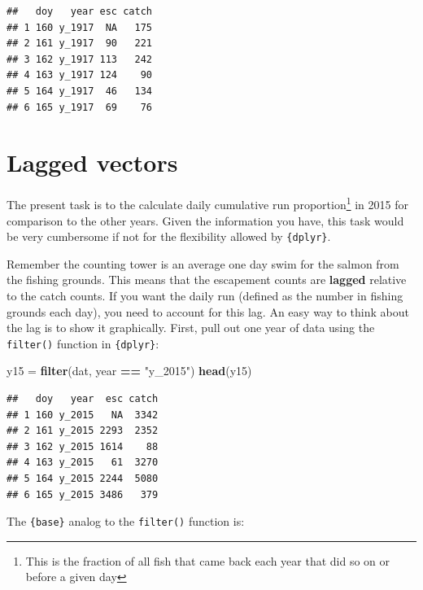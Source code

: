 \documentclass[]{book}
\newenvironment{Shaded}{\begin{snugshade}}{\end{snugshade}}
\newcommand{\KeywordTok}[1]{\textcolor[rgb]{0.13,0.29,0.53}{\textbf{#1}}}
\newcommand{\StringTok}[1]{\textcolor[rgb]{0.31,0.60,0.02}{#1}}
\newcommand{\CommentTok}[1]{\textcolor[rgb]{0.56,0.35,0.01}{\textit{#1}}}
\newcommand{\OperatorTok}[1]{\textcolor[rgb]{0.81,0.36,0.00}{\textbf{#1}}}
\newcommand{\NormalTok}[1]{#1}
\let\rmarkdownfootnote\footnote%
\def\footnote{\protect\rmarkdownfootnote}
\theoremstyle{definition}
\theoremstyle{definition}
\theoremstyle{definition}
\theoremstyle{remark}
\begin{document}
\begin{verbatim}
##   doy   year esc catch
## 1 160 y_1917  NA   175
## 2 161 y_1917  90   221
## 3 162 y_1917 113   242
## 4 163 y_1917 124    90
## 5 164 y_1917  46   134
## 6 165 y_1917  69    76
\end{verbatim}

\section{Lagged vectors}\label{lagged-vectors}

The present task is to the calculate daily cumulative run
proportion\footnote{This is the fraction of all fish that came back each
  year that did so on or before a given day} in 2015 for comparison to
the other years. Given the information you have, this task would be very
cumbersome if not for the flexibility allowed by \texttt{\{dplyr\}}.

Remember the counting tower is an average one day swim for the salmon
from the fishing grounds. This means that the escapement counts are
\textbf{lagged} relative to the catch counts. If you want the daily run
(defined as the number in fishing grounds each day), you need to account
for this lag. An easy way to think about the lag is to show it
graphically. First, pull out one year of data using the
\texttt{filter()} function in \texttt{\{dplyr\}}:

\begin{Shaded}
\begin{Highlighting}[]
\NormalTok{y15 =}\StringTok{ }\KeywordTok{filter}\NormalTok{(dat, year }\OperatorTok{==}\StringTok{ "y_2015"}\NormalTok{)}
\KeywordTok{head}\NormalTok{(y15)}
\end{Highlighting}
\end{Shaded}

\begin{verbatim}
##   doy   year  esc catch
## 1 160 y_2015   NA  3342
## 2 161 y_2015 2293  2352
## 3 162 y_2015 1614    88
## 4 163 y_2015   61  3270
## 5 164 y_2015 2244  5080
## 6 165 y_2015 3486   379
\end{verbatim}

The \texttt{\{base\}} analog to the \texttt{filter()} function is:

\begin{Shaded}
\end{Shaded}
\end{document}
